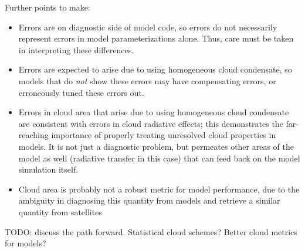 Further points to make:

\begin{itemize}
\tightlist
\item
  Errors are on diagnostic side of model code, so errors do not
  necessarily represent errors in model parameterizations alone. Thus,
  care must be taken in interpreting these differences.
\item
  Errors are expected to arise due to using homogeneous cloud
  condensate, so models that do \emph{not} show these errors may have
  compensating errors, or erroneously tuned these errors out.
\item
  Errors in cloud area that arise due to using homogeneous cloud
  condensate are consistent with errors in cloud radiative effects; this
  demonstrates the far-reaching importance of properly treating
  unresolved cloud properties in models. It is not just a diagnostic
  problem, but permeates other areas of the model as well (radiative
  transfer in this case) that can feed back on the model simulation
  itself.
\item
  Cloud area is probably not a robust metric for model performance, due
  to the ambiguity in diagnosing this quantity from models and retrieve
  a similar quantity from satellites
\end{itemize}

TODO: discuss the path forward. Statistical cloud schemes? Better cloud
metrics for models?
